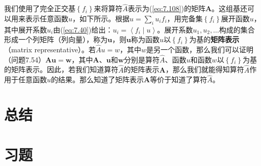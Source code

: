     我们使用了完全正交基$\left\{f_i\right\}$来将算符$\hat{A}$表示为(\ref{eq:7.108})的矩阵$\mathbf{A}$。这组基还可以用来表示任意函数$u$，如下所示。根据$u = \sum_{i}u_{i}f_i$，用完备集$\left\{f_i\right\}$展开函数$u$，其中展开系数$u_i$由(\ref{eq:7.40})给出：$u_i = \left\langle f_i \middle| u \right\rangle$。展开系数$u_1,u_2,\ldots$构成的集合形成一个列矩阵（列向量），称为$\mathbf{u}$，则$\mathbf{u}$称为函数$u$以$\left\{f_i\right\}$为基的\textbf{矩阵表示}（matrix representative）。若$\hat{A}u =w$，其中$w$是另一个函数，那么我们可以证明（问题7.54）$\mathbf{Au} = \mathbf{w}$，其中$\mathbf{A}$、$\mathbf{u}$和$\mathbf{w}$分别是算符$\hat{A}$、函数$u$和函数$w$以$\left\{f_i\right\}$为基的矩阵表示。因此，若我们知道算符$\hat{A}$的矩阵表示$\mathbf{A}$，那么我们就能得知算符$\hat{A}$作用于任意函数$u$的结果。那么知道了矩阵表示$\mathbf{A}$等价于知道了算符$\hat{A}$。
    
\section*{总结}

\section*{习题}